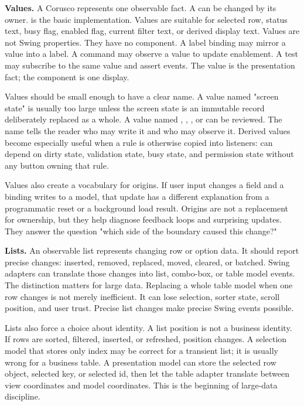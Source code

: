 \textbf{Values.} A Corusco  represents one observable fact. A  can be changed by its owner.  is the basic implementation. Values are suitable for selected row, status text, busy flag, enabled flag, current filter text, or derived display text. Values are not Swing properties. They have no component. A label binding may mirror a value into a label. A command may observe a value to update enablement. A test may subscribe to the same value and assert events. The value is the presentation fact; the component is one display.

Values should be small enough to have a clear name. A value named "screen state" is usually too large unless the screen state is an immutable record deliberately replaced as a whole. A value named , , , or  can be reviewed. The name tells the reader who may write it and who may observe it. Derived values become especially useful when a rule is otherwise copied into listeners:  can depend on dirty state, validation state, busy state, and permission state without any button owning that rule.

Values also create a vocabulary for origins. If user input changes a field and a binding writes to a model, that update has a different explanation from a programmatic reset or a background load result. Origins are not a replacement for ownership, but they help diagnose feedback loops and surprising updates. They answer the question "which side of the boundary caused this change?"

\textbf{Lists.} An observable list represents changing row or option data. It should report precise changes: inserted, removed, replaced, moved, cleared, or batched. Swing adapters can translate those changes into list, combo-box, or table model events. The distinction matters for large data. Replacing a whole table model when one row changes is not merely inefficient. It can lose selection, sorter state, scroll position, and user trust. Precise list changes make precise Swing events possible.

Lists also force a choice about identity. A list position is not a business identity. If rows are sorted, filtered, inserted, or refreshed, position changes. A selection model that stores only index may be correct for a transient list; it is usually wrong for a business table. A presentation model can store the selected row object, selected key, or selected id, then let the table adapter translate between view coordinates and model coordinates. This is the beginning of large-data discipline.

